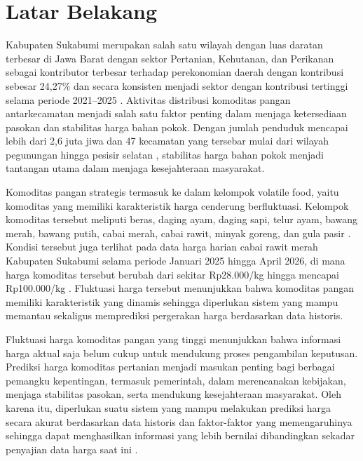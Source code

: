 
\section{Latar Belakang}

Kabupaten Sukabumi merupakan salah satu wilayah dengan luas daratan terbesar di Jawa Barat \parencite{bps-luas-2025} dengan sektor Pertanian, Kehutanan, dan Perikanan sebagai kontributor terbesar terhadap perekonomian daerah dengan kontribusi sebesar 24,27\% dan secara konsisten menjadi sektor dengan kontribusi tertinggi selama periode 2021–2025 \parencite{bps-sukabumi-2026}. Aktivitas distribusi komoditas pangan antarkecamatan menjadi salah satu faktor penting dalam menjaga ketersediaan pasokan dan stabilitas harga bahan pokok. Dengan jumlah penduduk mencapai lebih dari 2,6 juta jiwa dan 47 kecamatan yang tersebar mulai dari wilayah pegunungan hingga pesisir selatan \parencite{bps-penduduk-2025}, stabilitas harga bahan pokok menjadi tantangan utama dalam menjaga kesejahteraan masyarakat.

Komoditas pangan strategis termasuk ke dalam kelompok volatile food, yaitu komoditas yang memiliki karakteristik harga cenderung berfluktuasi. Kelompok komoditas tersebut meliputi beras, daging ayam, daging sapi, telur ayam, bawang merah, bawang putih, cabai merah, cabai rawit, minyak goreng, dan gula pasir \parencite{Helbawanti_Saputro_Ulfa_2021}. Kondisi tersebut juga terlihat pada data harga harian cabai rawit merah Kabupaten Sukabumi selama periode Januari 2025 hingga April 2026, di mana harga komoditas tersebut berubah dari sekitar Rp28.000/kg hingga mencapai Rp100.000/kg \parencite{data-pemerintah}. Fluktuasi harga tersebut menunjukkan bahwa komoditas pangan memiliki karakteristik yang dinamis sehingga diperlukan sistem yang mampu memantau sekaligus memprediksi pergerakan harga berdasarkan data historis.

Fluktuasi harga komoditas pangan yang tinggi menunjukkan bahwa informasi harga aktual saja belum cukup untuk mendukung proses pengambilan keputusan. Prediksi harga komoditas pertanian menjadi masukan penting bagi berbagai pemangku kepentingan, termasuk pemerintah, dalam merencanakan kebijakan, menjaga stabilitas pasokan, serta mendukung kesejahteraan masyarakat. Oleh karena itu, diperlukan suatu sistem yang mampu melakukan prediksi harga secara akurat berdasarkan data historis dan faktor-faktor yang memengaruhinya sehingga dapat menghasilkan informasi yang lebih bernilai dibandingkan sekadar penyajian data harga saat ini \parencite{bhardwaj2023innovativedeeplearningbased}.

